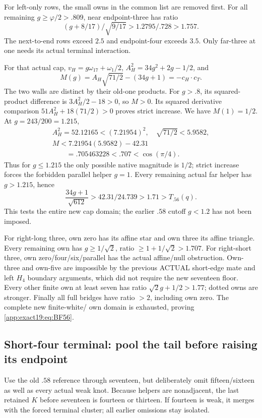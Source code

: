 \documentclass[11pt]{article}
\theoremstyle{definition}
\theoremstyle{remark}
\begin{document}
For left-only rows, the small
owns in the common list are
removed first.
For all remaining \(g\ge\varphi/2>.809\),
near endpoint-three has ratio
\[
       (g+8/17)/\sqrt{9/17}>1.2795/.728>1.757 .
\]
The next-to-end rows exceed \(2.5\)
and endpoint-four exceeds \(3.5\).
Only far-three at one needs its
actual terminal interaction.

For that actual cap,
\(v_H=g\omega_{17}+\omega_1/2\),
\(A_H^2=34g^2+2g-1/2\), and
\[
                    M(g)=A_H\sqrt{71/2}-(34g+1)=-c_H\cdot c_T .
\]
The two walls are distinct by their
old-one products.
For \(g>.8\), its squared-product
difference is \(3A_H^2/2-18>0\),
so \(M>0\).
Its squared derivative comparison
\(51A_H^2+18(71/2)>0\) proves strict
increase.
We have \(M(1)=1/2\).
At \(g=243/200=1.215\),
\[
\begin{gathered}
 A_H^2=52.12165<(7.21954)^2,\quad\sqrt{71/2}<5.9582,\\
 M<7.21954(5.9582)-42.31\\
 \qquad=.705463228<.707<\cos(\pi/4).
\end{gathered}
\]
Thus for \(g\le1.215\) the only
possible native magnitude is \(1/2\);
strict increase forces the forbidden
parallel helper \(g=1\).
Every remaining actual far helper
has \(g>1.215\), hence
\[
                      \frac{34g+1}{\sqrt{612}}
                         >42.31/24.739>1.71>T_{.56}(q).
\]
This tests the entire new cap
domain; the earlier \(.58\) cutoff
\(g<1.2\) has not been imposed.

For right-long three, own zero
has its affine star and own three
its affine triangle.
Every remaining own has
\(g\ge1/\sqrt2\), ratio
\(\ge1+1/\sqrt2>1.707\).
For right-short three, own
zero/four/six/parallel has the
actual affine/null obstruction.
Own-three and own-five are
impossible by the previous
ACTUAL short-edge mate and left
\(H_4\) boundary arguments, which
did not require the new seventeen
floor.
Every other finite own at least
seven has ratio
\(\sqrt2g+1/2>1.77\); dotted
owns are stronger.
Finally all full bridges have
ratio \(>2\), including own zero.
The complete new finite-white/
own domain is exhausted, proving
\eqref{app:exact19:eq:BF56}.

\subsection{Short-four terminal: pool the tail before raising its endpoint}
\label{app:exact19:Bshortfourfinish}

Use the old \(.58\) reference
through seventeen, but deliberately
omit fifteen/sixteen as well as
every actual weak knot.
Because helpers are nonadjacent,
the last retained \(K\) before
seventeen is fourteen or thirteen.
If fourteen is weak, it merges
with the forced terminal cluster;
all earlier omissions stay isolated.
\end{document}
